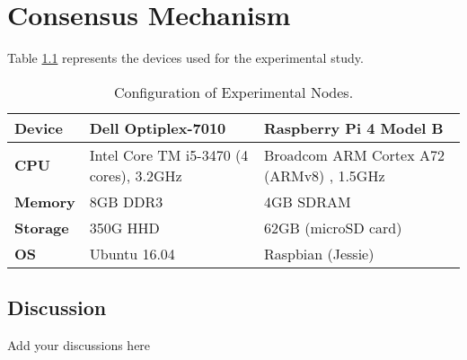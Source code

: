\chapter{Consensus Mechanism}
\label{ch:consensus}
 Table \ref{tab:ch6_testbed} represents the devices used for the experimental study. 

\begin{table}[t]
    \caption{Configuration of Experimental Nodes.} 
    \vspace{-0.18in}
    \label{tab:ch6_testbed}
    \begin{center}       
    \begin{tabular}{|l|p{5.0cm}|p{5.0cm}|} %
    \hline
    \rule[-1ex]{0pt}{3.5ex} \textbf{Device} & Dell Optiplex-7010 & Raspberry Pi 4 Model B \\
    \hline
    \rule[-1ex]{0pt}{3.5ex} \textbf{CPU} & Intel Core TM i5-3470 (4 cores), 3.2GHz & Broadcom ARM Cortex A72 (ARMv8) , 1.5GHz \\
    \hline
    \rule[-1ex]{0pt}{3.5ex} \textbf{Memory} & 8GB DDR3 & 4GB SDRAM \\
    \hline
    \rule[-1ex]{0pt}{3.5ex} \textbf{Storage} & 350G HHD & 62GB (microSD card) \\
    \hline
    \rule[-1ex]{0pt}{3.5ex} \textbf{OS} & Ubuntu 16.04 & Raspbian (Jessie) \\
    \hline
    \end{tabular}
    \end{center}
    \vspace{-0.10in}
\end{table}


\section{Discussion}
\label{sec:ch6_discussion}

Add your discussions here


